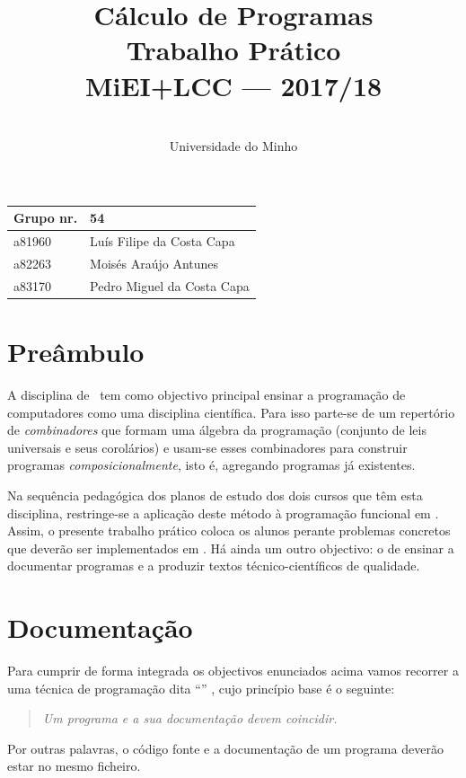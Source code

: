 \documentclass[a4paper]{article}
\title{
       	    Cálculo de Programas
\\
       	Trabalho Prático
\\
       	MiEI+LCC --- 2017/18
}
\author{
       	\dium
\\
       	Universidade do Minho
}
\date\mydate
\begin{document}
\maketitle

\begin{center}\large
\begin{tabular}{ll}
\textbf{Grupo} nr. & 54
\\\hline
a81960 & Luís Filipe da Costa Capa
\\
a82263 & Moisés Araújo Antunes
\\
a83170 & Pedro Miguel da Costa Capa
\end{tabular}
\end{center}

\section{Preâmbulo}

A disciplina de \CP\ tem como objectivo principal ensinar
a progra\-mação de computadores como uma disciplina científica. Para isso
parte-se de um repertório de \emph{combinadores} que formam uma álgebra da
programação (conjunto de leis universais e seus corolários) e usam-se esses
combinadores para construir programas \emph{composicionalmente}, isto é,
agregando programas já existentes.
  
Na sequência pedagógica dos planos de estudo dos dois cursos que têm esta
disciplina, restringe-se a aplicação deste método à programação funcional
em \Haskell. Assim, 
o presente trabalho prático coloca os alunos perante problemas
concretos que deverão ser implementados em \Haskell.
Há ainda um outro objectivo: o de ensinar a documentar programas e
a produzir textos técnico-científicos de qualidade.

\section{Documentação}
Para cumprir de forma integrada os objectivos enunciados acima vamos recorrer
a uma técnica de programa\-ção dita ``'' \cite{Kn92}, cujo
princípio base é o seguinte:
\begin{quote}\em
Um programa e a sua documentação devem coincidir.
\end{quote}
Por outras palavras, o código fonte e a documentação de um programa deverão estar no
mesmo ficheiro.
\end{document}
